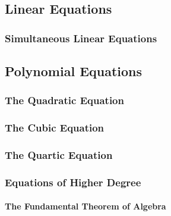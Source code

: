 \subsection{Linear Equations}


\subsubsection{Simultaneous Linear Equations}






\subsection{Polynomial Equations}

\subsubsection{The Quadratic Equation}

\subsubsection{The Cubic Equation}

\subsubsection{The Quartic Equation}


\subsubsection{Equations of Higher Degree}

\paragraph{The Fundamental Theorem of Algebra}

